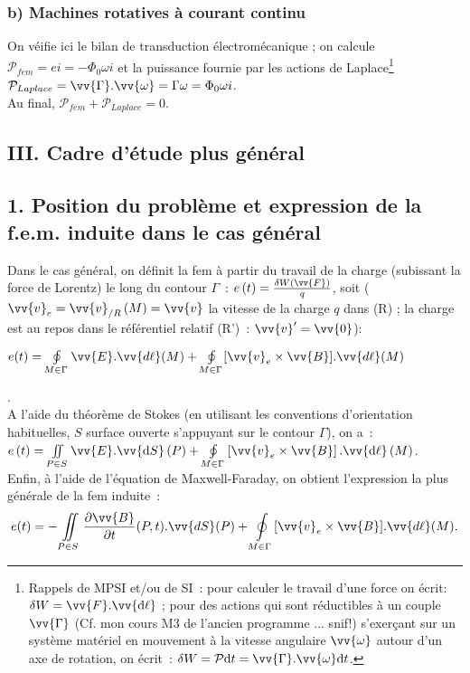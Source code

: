 \documentclass{article}
\newcommand{\mathcolorbox}[2]{\colorbox{#1}{$#2$}}
\let\oldiint\iint
\renewcommand{\iint}{\oldiint\limits}
\let\oldoint\oint
\renewcommand{\oint}{\oldoint\limits}
\renewcommand\overrightarrow{\vv}
\let\rot\relax
\DeclareMathOperator{\rot}{\overrightarrow{\mathrm{rot}}}
\begin{document}
\subsubsection*{b) Machines rotatives à courant continu}
On véifie ici le bilan de transduction électromécanique ; on calcule
$\mathcal{P}_{fem} = e i = -\Phi_{0}\omega i$ et la puissance
fournie par les actions de Laplace\footnote{Rappels de MPSI et/ou de
SI : pour calculer le travail d'une force on écrit: $\delta W
=\overrightarrow{F}.\overrightarrow{\mathrm{d}\ell}$ ; pour des actions qui
sont réductibles à un couple $\overrightarrow{\Gamma}$ (Cf. mon
cours M3 de l'ancien programme ... snif!) s'exerçant sur un système
matériel en mouvement à la vitesse angulaire
$\overrightarrow{\omega}$ autour d'un axe de rotation, on écrit :
$\delta W = \mathcal{P}\mathrm{d}t =
\overrightarrow{\Gamma}.\overrightarrow{\omega}\mathrm{d}t$.}
$\mathcal{P}_{Laplace} =
\overrightarrow{\Gamma}.\overrightarrow{\omega} = \Gamma \omega =
\Phi_{0}\omega i$. \\
Au final, $\mathcal{P}_{fem}+\mathcal{P}_{Laplace}=0$.

\subsection*{III. Cadre d'étude plus général}
\subsection*{1. Position du problème et expression de la f.e.m. induite
dans le cas général}
Dans le cas général, on définit la fem à partir du travail de la
charge (subissant la force de Lorentz) le long du contour $\Gamma$ :
$e\left(t\right) = \frac{\delta W\left(\overrightarrow{F}\right)}{q}$, soit
($\overrightarrow{v}_{e} =
\overrightarrow{v}_{/R}\left(M\right)=\overrightarrow{v}$ la vitesse de la
charge $q$ dans (R) ; la charge est au repos dans le référentiel
relatif (R') : $\overrightarrow{v}'=\overrightarrow{0}$):
\\
\centerline{\mathcolorbox{gray!20}{e(t) = \oint_{M\in
\Gamma}\overrightarrow{E}.\overrightarrow{d\ell}(M)+\oint_{M\in
\Gamma}[\overrightarrow{v}_{e}\times
\overrightarrow{B}].\overrightarrow{d\ell}(M)}}. \\
A l'aide du théorème de Stokes (en utilisant les conventions
d'orientation habituelles, $S$ surface ouverte s'appuyant sur le
contour $\Gamma$), on a : $e\left(t\right) = \iint_{P\in
S}\rot \overrightarrow{E}.\overrightarrow{\mathrm{d}S}\left(P\right)+\oint_{M\in
\Gamma}\left[\overrightarrow{v}_{e}\times
\overrightarrow{B}\right].\overrightarrow{\mathrm{d}\ell}\left(M\right)$. \\
Enfin, à l'aide de l'équation de Maxwell-Faraday, on obtient
l'expression la plus générale de la fem induite :
\begin{eqnarray}\label{Eq.60}
e(t) = -\iint_{P\in S}\frac{\partial\overrightarrow{B}}{\partial
t}(P,t).\overrightarrow{dS}(P) +\oint_{M\in
\Gamma}[\overrightarrow{v}_{e}\times
\overrightarrow{B}].\overrightarrow{d\ell}(M).
\end{eqnarray}
\end{document}
